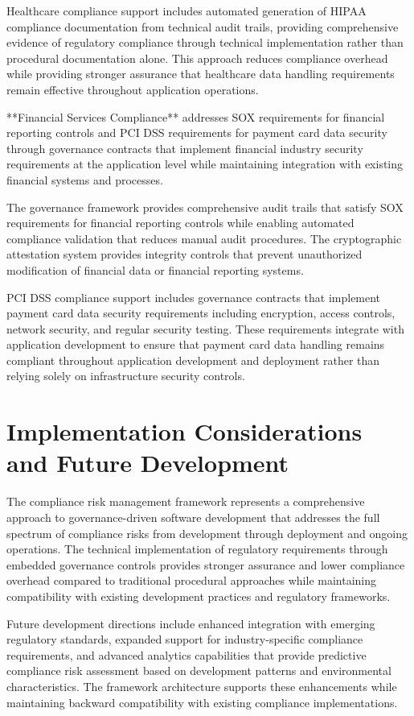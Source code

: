 Healthcare compliance support includes automated generation of HIPAA compliance documentation from technical audit trails, providing comprehensive evidence of regulatory compliance through technical implementation rather than procedural documentation alone. This approach reduces compliance overhead while providing stronger assurance that healthcare data handling requirements remain effective throughout application operations.

**Financial Services Compliance** addresses SOX requirements for financial reporting controls and PCI DSS requirements for payment card data security through governance contracts that implement financial industry security requirements at the application level while maintaining integration with existing financial systems and processes.

The governance framework provides comprehensive audit trails that satisfy SOX requirements for financial reporting controls while enabling automated compliance validation that reduces manual audit procedures. The cryptographic attestation system provides integrity controls that prevent unauthorized modification of financial data or financial reporting systems.

PCI DSS compliance support includes governance contracts that implement payment card data security requirements including encryption, access controls, network security, and regular security testing. These requirements integrate with application development to ensure that payment card data handling remains compliant throughout application development and deployment rather than relying solely on infrastructure security controls.

\section*{Implementation Considerations and Future Development}

The compliance risk management framework represents a comprehensive approach to governance-driven software development that addresses the full spectrum of compliance risks from development through deployment and ongoing operations. The technical implementation of regulatory requirements through embedded governance controls provides stronger assurance and lower compliance overhead compared to traditional procedural approaches while maintaining compatibility with existing development practices and regulatory frameworks.

Future development directions include enhanced integration with emerging regulatory standards, expanded support for industry-specific compliance requirements, and advanced analytics capabilities that provide predictive compliance risk assessment based on development patterns and environmental characteristics. The framework architecture supports these enhancements while maintaining backward compatibility with existing compliance implementations.

